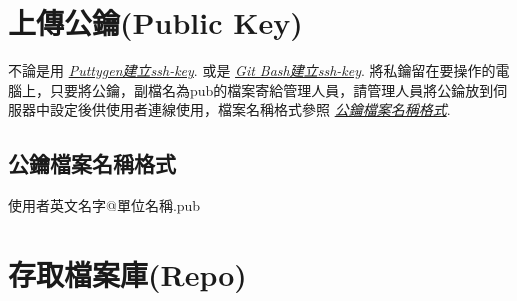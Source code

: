 \documentclass[letterpaper,10pt,english]{sphinxmanual}
\begin{document}
\section{上傳公鑰(Public Key)}
\label{_doc/writing/index:public-key}
不論是用 {\hyperref[_doc/writing/index:ssh-key-puttygen]{\emph{Puttygen建立ssh-key}}}. 或是 {\hyperref[_doc/writing/index:ssh-key-gitbash]{\emph{Git Bash建立ssh-key}}}. 將私鑰留在要操作的電腦上，只要將公鑰，副檔名為pub的檔案寄給管理人員，請管理人員將公錀放到伺服器中設定後供使用者連線使用，檔案名稱格式參照 {\hyperref[_doc/writing/index:publickey-filename-format]{\emph{公鑰檔案名稱格式}}}.


\subsection{公鑰檔案名稱格式}
\label{_doc/writing/index:publickey-filename-format}\label{_doc/writing/index:id5}
使用者英文名字@單位名稱.pub


\section{存取檔案庫(Repo)}
\label{_doc/writing/index:repo}
\end{document}
